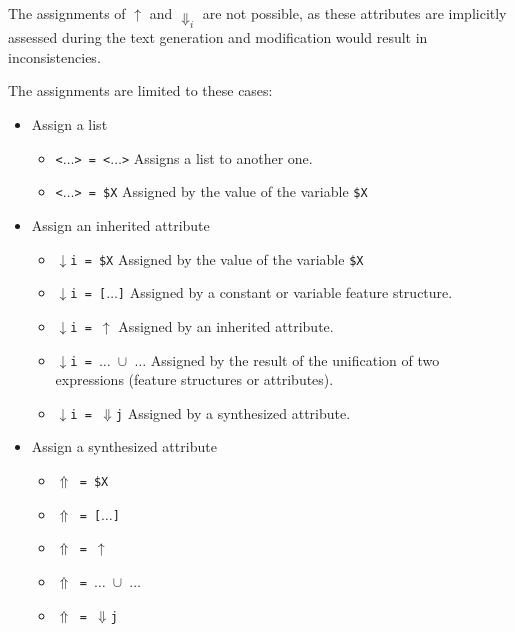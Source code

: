 \documentclass[11pt]{article}
\begin{document}
\begin{itemize}
The assignments of $\uparrow$ and $\Downarrow_i$ are not
  possible, as these attributes are implicitly assessed during the
  text generation and modification would result in
  inconsistencies.

    The assignments are limited to these cases:
    \begin{itemize}
      
    \item Assign a list
      
      \begin{itemize}
      \item  \verb#<#$\dots$\verb#> = <#$\dots$\verb#># Assigns a list to
        another one.
      \item \verb#<#$\dots$\verb#> = $X# Assigned by the value of the
        variable \verb#$X#
      \end{itemize}
      
    \item Assign an inherited attribute
    
      \begin{itemize}
      \item $\downarrow$\verb#i = $X# Assigned by the value of the
        variable \verb#$X#
      \item $\downarrow$\verb#i = [#$\dots$\verb#]# Assigned by a
        constant or variable feature structure.
      \item $\downarrow$\verb#i = #$\uparrow$ Assigned by an inherited attribute.
      \item $\downarrow$\verb#i = #$\dots$\verb# #$\cup$\verb# #$\dots$
        Assigned by the result of the unification of two expressions
        (feature structures or attributes).
      \item $\downarrow$\verb#i = #$\Downarrow$\verb#j# Assigned by a
        synthesized attribute.
      \end{itemize}
      
    \item Assign a synthesized attribute
    
      \begin{itemize}
      \item $\Uparrow$\verb# = $X#
      \item $\Uparrow$\verb# = [#$\dots$\verb#]#
      \item $\Uparrow$\verb# = #$\uparrow$
      \item $\Uparrow$\verb# = #$\dots$\verb# #$\cup$\verb# #$\dots$
      \item $\Uparrow$\verb# = #$\Downarrow$\verb#j#
      \end{itemize}
      

\end{itemize}
\end{itemize}
\end{document}
